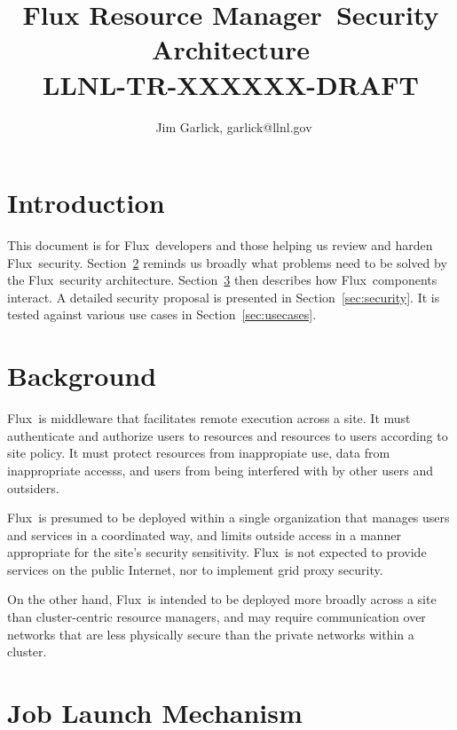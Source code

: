 \documentclass[10pt]{article}
\newcommand{\flux}{Flux}
\newcommand{\fluxfull}{Flux Resource Manager}
\begin{document}
\title{\fluxfull\ Security Architecture\\
{\large LLNL-TR-XXXXXX-DRAFT}}
\author{\
Jim Garlick, garlick@llnl.gov}


\maketitle

\section{Introduction}

This document is for \flux\ developers and those helping us review and
harden \flux\ security.
Section~\ref{sec:background} reminds us broadly what problems need
to be solved by the \flux\ security architecture.
Section~\ref{sec:softarch} then describes how \flux\ components
interact.
A detailed security proposal is presented in Section~\ref{sec:security}.
It is tested against various use cases in Section~\ref{sec:usecases}.

\section{Background}
\label{sec:background}

\flux\ is middleware that facilitates remote execution across a site.
It must authenticate
and authorize users to resources and resources to users according to
site policy.  It must protect resources from inappropiate use,
data from inappropriate accesss, and users from being interfered with
by other users and outsiders.

\flux\ is presumed to be deployed within a single organization that
manages users and services in a coordinated way, and limits outside
access in a manner appropriate for the site's security sensitivity.
\flux\ is not expected to provide services on the public Internet,
nor to implement grid proxy security.

On the other hand, \flux\ is intended to be deployed more broadly
across a site than cluster-centric resource managers, and may
require communication over networks that are less physically secure
than the private networks within a cluster.

\section{Job Launch Mechanism}
\label{sec:softarch}
\end{document}
